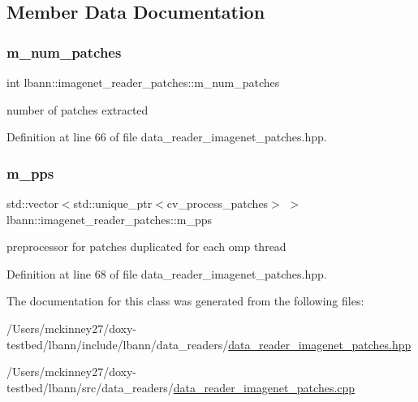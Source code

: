 \subsection{Member Data Documentation}
\mbox{\label{classlbann_1_1imagenet__reader__patches_a3380936d3d01d5efc77f0f129891fc65}} 
\subsubsection{\texorpdfstring{m\+\_\+num\+\_\+patches}{m\_num\_patches}}
{\footnotesize\ttfamily int lbann\+::imagenet\+\_\+reader\+\_\+patches\+::m\+\_\+num\+\_\+patches\hspace{0.3cm}{\ttfamily [protected]}}

number of patches extracted 

Definition at line 66 of file data\+\_\+reader\+\_\+imagenet\+\_\+patches.\+hpp.

\mbox{\label{classlbann_1_1imagenet__reader__patches_a76a4c760b0430ce6df990b9e3bd33fef}} 
\subsubsection{\texorpdfstring{m\+\_\+pps}{m\_pps}}
{\footnotesize\ttfamily std\+::vector$<$std\+::unique\+\_\+ptr$<$cv\+\_\+process\+\_\+patches$>$ $>$ lbann\+::imagenet\+\_\+reader\+\_\+patches\+::m\+\_\+pps\hspace{0.3cm}{\ttfamily [protected]}}



preprocessor for patches duplicated for each omp thread 



Definition at line 68 of file data\+\_\+reader\+\_\+imagenet\+\_\+patches.\+hpp.



The documentation for this class was generated from the following files\+:\begin{DoxyCompactItemize}
\item 
/\+Users/mckinney27/doxy-\/testbed/lbann/include/lbann/data\+\_\+readers/\hyperlink{data__reader__imagenet__patches_8hpp}{data\+\_\+reader\+\_\+imagenet\+\_\+patches.\+hpp}\item 
/\+Users/mckinney27/doxy-\/testbed/lbann/src/data\+\_\+readers/\hyperlink{data__reader__imagenet__patches_8cpp}{data\+\_\+reader\+\_\+imagenet\+\_\+patches.\+cpp}\end{DoxyCompactItemize}
